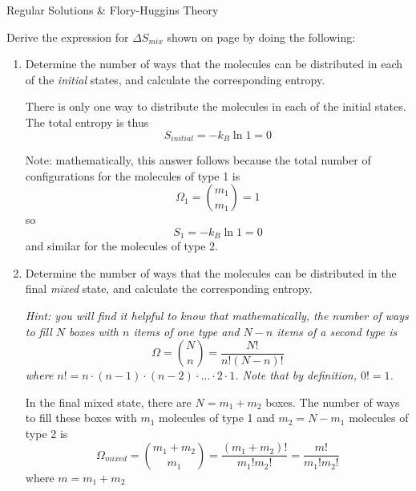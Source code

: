\begin{activity}{Regular Solutions \& Flory-Huggins Theory}
\begin{exercises}
\begin{solution}{}
					\end{solution}
					
		\exercise \label{\labelbase:exc:idealmixing} Derive the expression for $\Delta S_{mix}$ shown on page \pageref{\labelbase:eqn:idealS} by doing the following:
		
			\begin{enumerate}
				\item Determine the number of ways that the molecules can be distributed in each of the \emph{initial} states, and calculate the corresponding entropy.
				
					\begin{solution}{}
						There is only one way to distribute the molecules in each of the initial states.  The total entropy is thus
						\begin{equation*}
							S_{initial} = - k_B \ln 1 = 0
						\end{equation*}
						
						Note: mathematically, this answer follows because the total number of configurations for the molecules of type 1 is
						\begin{equation*}
							\Omega_1 = {m_1 \choose m_1} = 1
						\end{equation*}
						so
						\begin{equation*}
							S_1 = - k_B \ln 1 = 0
						\end{equation*}
						and similar for the molecules of type 2.
					
					\end{solution}
				
				\item Determine the number of ways that the molecules can be distributed in the final \emph{mixed} state, and calculate the corresponding entropy.
				
					\emph{Hint: you will find it helpful to know that mathematically, the number of ways to fill $N$ boxes with $n$ items of one type and $N-n$ items of a second type is}
	\begin{equation*}
		\Omega = {N \choose n} = \frac{N!}{n!(N-n)!}
	\end{equation*}
	\emph{where $n! = n\cdot(n-1)\cdot(n-2)\cdot\dots\cdot 2 \cdot 1$.	Note that by definition, $0!=1$.}
				
					\begin{solution}{}
						In the final mixed state, there are $N=m_1+m_2$ boxes.  The number of ways to fill these boxes with $m_1$ molecules of type 1 and $m_2=N-m_1$ molecules of type 2 is
						\begin{equation*}
							\Omega_{mixed} = {{m_1+m_2} \choose m_1} = \frac{(m_1+m_2)!}{m_1! m_2!} = \frac{m!}{m_1! m_2!} 
						\end{equation*}
						where $m=m_1+m_2$
						

\end{solution}
\end{enumerate}
\end{exercises}
\end{activity}
